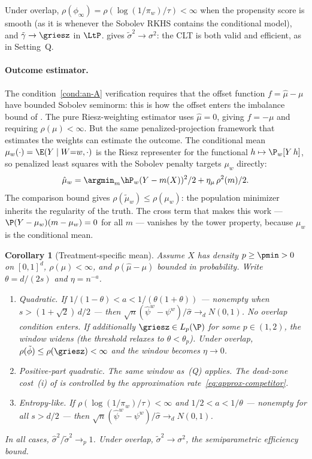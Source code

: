 \documentclass{article}
\newtheorem{corollary}[theorem]{Corollary}
\begin{document}
Under overlap,
$\rho(\phi_\infty)
  = \rho(\log(1/\pi_w)/\tau) < \infty$
when the propensity score
is smooth
(as it is whenever
the Sobolev RKHS
contains the conditional model),
and $\tilde\gamma \to \griesz$ in $\LtP$.
 gives
$\tilde\sigma^2 \to \sigma^2$:
the CLT is both valid and efficient,
as in Setting~Q.

\paragraph{Outcome estimator.}
The condition~\ref{cond:an-A} verification
requires that the offset function
$f = \hat\mu - \mu$
have bounded Sobolev seminorm:
this is how the offset enters
the imbalance bound
of .
The pure Riesz-weighting estimator
uses $\hat\mu = 0$,
giving $f = -\mu$
and requiring $\rho(\mu) < \infty$.
But the same penalized-projection framework
that estimates the weights
can estimate the outcome.
The conditional mean
$\mu_w(\cdot) = \E(Y \mid W{=}w, \cdot)$
is the Riesz representer
for the functional
$h \mapsto \P_w[Y\, h]$,
so penalized least squares
with the Sobolev penalty
targets $\mu_w$ directly:
\begin{equation}\label{eq:tsm-outcome}
\hat\mu_w
  = \argmin_{m}
    \hP_w (Y - m(X))^2/2
    + \eta_\mu\, \rho^2(m)/2.
\end{equation}
The comparison bound
gives $\rho(\tilde\mu_w) \le \rho(\mu_w)$:
the population minimizer
inherits the regularity of the truth.
The cross term that makes this work ---
$\P(Y - \mu_w)(m - \mu_w) = 0$
for all $m$ ---
vanishes by the tower property,
because $\mu_w$ is the conditional mean.

\begin{corollary}[Treatment-specific mean]
\label{cor:tsm}
Assume $X$ has density $p \ge \pmin > 0$
on $[0,1]^d$,
$\rho(\mu) < \infty$,
and $\rho(\hat\mu - \mu)$ bounded in probability.
Write $\theta = d/(2s)$ and $\eta = n^{-a}$.
\begin{enumerate}
\item[\textup{(Q)}]
\textit{Quadratic.}
If $1/(1-\theta) < a < 1/(\theta(1+\theta))$
--- nonempty when $s > (1+\sqrt{2})\,d/2$ ---
then
$\sqrt{n}(\hat\psi^w - \psi^w)/\hat\sigma \to_d N(0,1)$.
No overlap condition enters.
If additionally $\griesz \in L_p(\P)$
for some $p \in (1,2)$,
the window widens
(the threshold relaxes to $\theta < \theta_p$).
Under overlap,
$\rho(\tilde\phi) \le \rho(\griesz) < \infty$
and the window becomes $\eta \to 0$.
\item[\textup{(Q$_+$)}]
\textit{Positive-part quadratic.}
The same window as~\textup{(Q)} applies.
The dead-zone cost~(i) of 
is controlled
by the approximation rate~\eqref{eq:approx-competitor}.
\item[\textup{(E)}]
\textit{Entropy-like.}
If $\rho(\log(1/\pi_w)/\tau) < \infty$
and $1/2 < a < 1/\theta$
--- nonempty for all $s > d/2$ ---
then
$\sqrt{n}(\hat\psi^w - \psi^w)/\hat\sigma \to_d N(0,1)$.
\end{enumerate}
In all cases,
$\hat\sigma^2 / \tilde\sigma^2 \to_p 1$.
Under overlap,
$\tilde\sigma^2 \to \sigma^2$,
the semiparametric efficiency bound.
\end{corollary}
\end{document}
